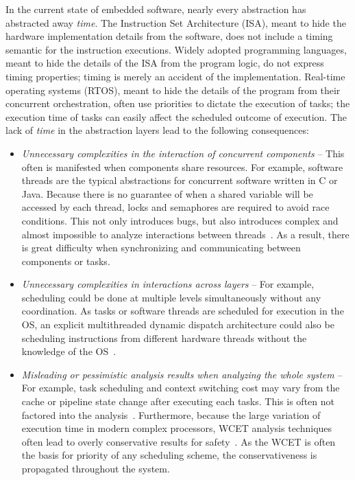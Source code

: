 In the current state of embedded software, nearly every abstraction has abstracted away \emph{time}.
The Instruction Set Architecture (ISA), meant to hide the hardware implementation details from the software, does not include a timing semantic for the instruction executions.  
Widely adopted programming languages, meant to hide the details of the ISA from the program logic, do not express timing properties; timing is merely an accident of the implementation.
Real-time operating systems (RTOS), meant to hide the details of the program from their concurrent orchestration, often use priorities to dictate the execution of tasks; the execution time of tasks can easily affect the scheduled outcome of execution.
The lack of \emph{time} in the abstraction layers lead to the following consequences:
\begin{itemize}
\item \emph{Unnecessary complexities in the interaction of concurrent components} --  
This often is manifested when components share resources. 
For example, software threads are the typical abstractions for concurrent software written in C or Java. 
Because there is no guarantee of when a shared variable will be accessed by each thread, locks and semaphores are required to avoid race conditions. 
This not only introduces bugs, but also introduces complex and almost impossible to analyze interactions between threads~\cite{Lee2006threads}. 
As a result, there is great difficulty when synchronizing and communicating between components or tasks.

\item \emph{Unnecessary complexities in interactions across layers} -- 
For example, scheduling could be done at multiple levels simultaneously without any coordination. 
As tasks or software threads are scheduled for execution in the OS, an explicit multithreaded dynamic dispatch architecture could also be scheduling instructions from different hardware threads without the knowledge of the OS~\cite{thiele_et_al:DSP:2004:2}.

\item \emph{Misleading or pessimistic analysis results when analyzing the whole system} -- 
For example, task scheduling and context switching cost may vary from the cache or pipeline state change after executing each tasks. 
This is often not factored into the analysis~\cite{thiele_et_al:DSP:2004:2}. 
Furthermore, because the  large variation of execution time in modern complex processors, WCET analysis techniques often lead to overly conservative results for safety~\cite{Wilhelm2008survey}. 
As the WCET is often the basis for priority of any scheduling scheme, the conservativeness is propagated throughout the system.
\end{itemize}

